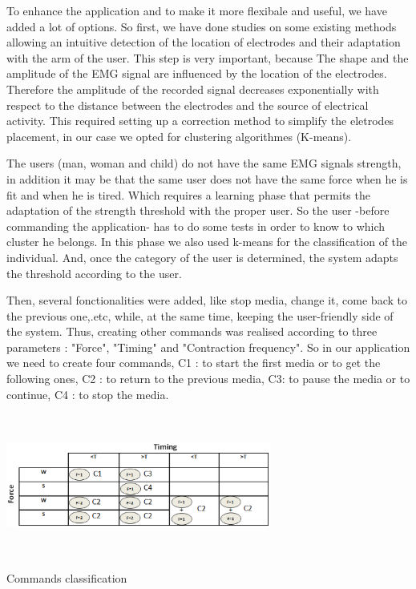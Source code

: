\documentclass[conference]{IEEEtran}
\begin{document}
To enhance the application and to make it more flexibale and useful, we have added a lot of options. So first, we have done studies on some existing
methods allowing an intuitive detection of the location of electrodes and their adaptation with the arm of the user. This step is very important, because The
shape and the amplitude of the EMG signal are influenced by the location of the electrodes. Therefore the amplitude of the recorded signal decreases
exponentially with respect to the distance between the electrodes and the source of electrical activity. This required setting up a correction method to
simplify the eletrodes placement, in our case we opted for clustering algorithmes (K-means).\par
The users (man, woman and child) do not have the same EMG signals strength, in addition it may be that the same user does not have the same force when he is
fit and when he is tired. Which requires a learning phase that permits the adaptation of the strength threshold with the proper user. So the user -before
commanding the application- has to do some tests in order to know to which cluster he belongs. In this phase we also used k-means for the classification of
the individual. And, once the category of the user is determined, the system adapts the threshold according to the user.\par
Then, several fonctionalities were added, like stop media, change it, come back to the previous one,.etc, while, at the same time, keeping the user-friendly side of the system.
Thus, creating other commands was realised according to three parameters : "Force", "Timing" and "Contraction frequency". So in our application we need to
create four commands, C1 : to start the first media or to get the following ones, C2 : to return to the previous media, C3: to pause the media or to continue,
C4 : to stop the media.

\begin{table}[h]
    \hspace*{0 cm}
    \includegraphics[width=8.7cm, height=4.7cm]{Images/Tableau.eps}
    \caption{Commands classification}
    \label{tab:classification}
\end{table}
\end{document}
